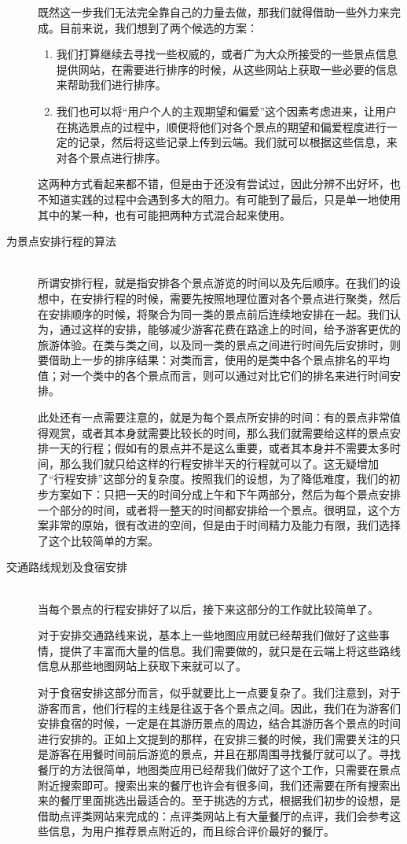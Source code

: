 \documentclass[12pt,a4paper]{article}
\begin{document}
\begin{CJK}{UTF8}{gbsn}
\begin{description}
	既然这一步我们无法完全靠自己的力量去做，那我们就得借助一些外力来完成。目前来说，我们想到了两个候选的方案：
	\begin{enumerate}
	\item
	我们打算继续去寻找一些权威的，或者广为大众所接受的一些景点信息提供网站，在需要进行排序的时候，从这些网站上获取一些必要的信息来帮助我们进行排序。
	\item
	我们也可以将“用户个人的主观期望和偏爱”这个因素考虑进来，让用户在挑选景点的过程中，顺便将他们对各个景点的期望和偏爱程度进行一定的记录，然后将这些记录上传到云端。我们就可以根据这些信息，来对各个景点进行排序。
	\end{enumerate}
	这两种方式看起来都不错，但是由于还没有尝试过，因此分辨不出好坏，也不知道实践的过程中会遇到多大的阻力。有可能到了最后，只是单一地使用其中的某一种，也有可能把两种方式混合起来使用。

	\item[为景点安排行程的算法] \hfill \\
	所谓安排行程，就是指安排各个景点游览的时间以及先后顺序。在我们的设想中，在安排行程的时候，需要先按照地理位置对各个景点进行聚类，然后在安排顺序的时候，将聚合为同一类的景点前后连续地安排在一起。我们认为，通过这样的安排，能够减少游客花费在路途上的时间，给予游客更优的旅游体验。在类与类之间，以及同一类的景点之间进行时间先后安排时，则要借助上一步的排序结果：对类而言，使用的是类中各个景点排名的平均值；对一个类中的各个景点而言，则可以通过对比它们的排名来进行时间安排。

	此处还有一点需要注意的，就是为每个景点所安排的时间：有的景点非常值得观赏，或者其本身就需要比较长的时间，那么我们就需要给这样的景点安排一天的行程；假如有的景点并不是这么重要，或者其本身并不需要太多时间，那么我们就只给这样的行程安排半天的行程就可以了。这无疑增加了“行程安排”这部分的复杂度。按照我们的设想，为了降低难度，我们的初步方案如下：只把一天的时间分成上午和下午两部分，然后为每个景点安排一个部分的时间，或者将一整天的时间都安排给一个景点。很明显，这个方案非常的原始，很有改进的空间，但是由于时间精力及能力有限，我们选择了这个比较简单的方案。
	\item[交通路线规划及食宿安排] \hfill \\
	当每个景点的行程安排好了以后，接下来这部分的工作就比较简单了。

	对于安排交通路线来说，基本上一些地图应用就已经帮我们做好了这些事情，提供了丰富而大量的信息。我们需要做的，就只是在云端上将这些路线信息从那些地图网站上获取下来就可以了。

	对于食宿安排这部分而言，似乎就要比上一点要复杂了。我们注意到，对于游客而言，他们行程的主线是往返于各个景点之间。因此，我们在为游客们安排食宿的时候，一定是在其游历景点的周边，结合其游历各个景点的时间进行安排的。正如上文提到的那样，在安排三餐的时候，我们需要关注的只是游客在用餐时间前后游览的景点，并且在那周围寻找餐厅就可以了。寻找餐厅的方法很简单，地图类应用已经帮我们做好了这个工作，只需要在景点附近搜索即可。搜索出来的餐厅也许会有很多间，我们还需要在所有搜索出来的餐厅里面挑选出最适合的。至于挑选的方式，根据我们初步的设想，是借助点评类网站来完成的：点评类网站上有大量餐厅的点评，我们会参考这些信息，为用户推荐景点附近的，而且综合评价最好的餐厅。


\end{description}
\end{CJK}
\end{document}
